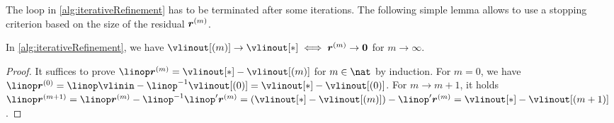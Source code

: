 \begin{algorithm}
  \begin{algorithmic}[1]
      \EndFor{}
    \EndFunction{}
  \end{algorithmic}
  \caption[%
    Iterative refinement%
  ]{%
    Application of a tensor product operator $\linop$
    on spatially adaptive sparse grids with iterative refinement,
    where $\linop'$ is an approximation of $\linop$.
    Inputs are the vector $\vlinin = (\linin{\*l,\*i})_{(\*l,\*i) \in \liset}$
    of input data (function values $\fcnval{\*l,\*i}$ at the grid points) and
    an initial solution $\vlinout[(0)]$.
    The output is the vector
    $\vlinout = (\linout{\*l,\*i})_{(\*l,\*i) \in \liset}$
    of output data (hierarchical surpluses $\surplus{\*l,\*i}$).%
  }%
  \label{alg:iterativeRefinement}%
\end{algorithm}

The loop in \cref{alg:iterativeRefinement} has to be terminated
after some iterations.
The following simple lemma allows to use a stopping criterion based on the
size of the residual ${\boldsymbol{r}}^{(m)}$.

\begin{shortlemma}
  \label{lemma:iterativeRefinementEquivalent}
  In \cref{alg:iterativeRefinement}, we have
  $\vlinout[(m)] \to \vlinout[\ast] \iff \*r^{(m)} \to \*0$ for
  $m \to \infty$.
\end{shortlemma}

\begin{proof}
  It suffices to prove $\linop \*r^{(m)} = \vlinout[\ast] - \vlinout[(m)]$
  for $m \in \nat$ by induction.
  For $m = 0$, we have
  $\linop \*r^{(0)}
  = \linop \vlinin - \linop^{-1} \vlinout[(0)]
  = \vlinout[\ast] - \vlinout[(0)]$.
  For $m \to m+1$, it holds
  $\linop \*r^{(m+1)}
  = \linop \*r^{(m)} - \linop^{-1} \linop' \*r^{(m)}
  = (\vlinout[\ast] - \vlinout[(m)]) - \linop' \*r^{(m)}
  = \vlinout[\ast] - \vlinout[(m+1)]$.
\end{proof}

